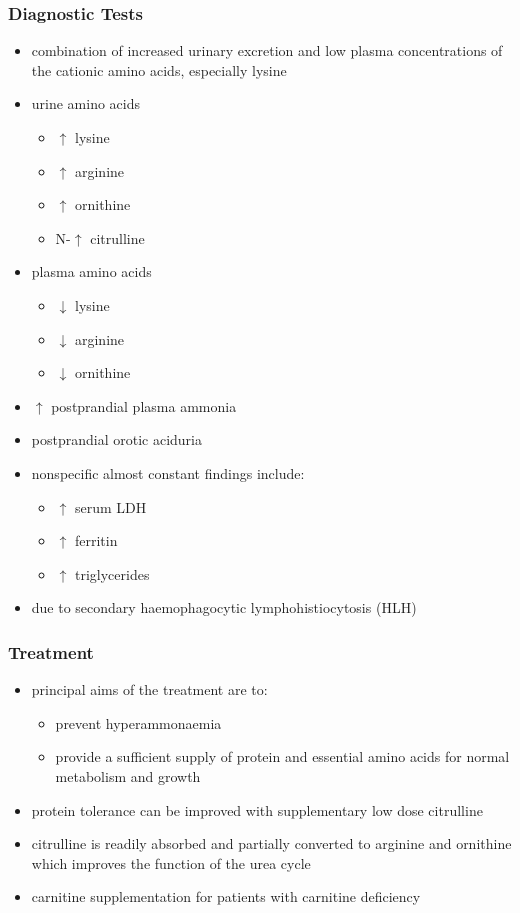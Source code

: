\documentclass{scrartcl}
\begin{document}
\subsubsection{Diagnostic Tests}
\label{sec:org27e0b70}
\begin{itemize}
\item combination of increased urinary excretion and low plasma
concentrations of the cationic amino acids, especially lysine
\item urine amino acids
\begin{itemize}
\item \(\uparrow\) lysine
\item \(\uparrow\) arginine
\item \(\uparrow\) ornithine
\item N-\(\uparrow\) citrulline
\end{itemize}
\item plasma amino acids
\begin{itemize}
\item \(\downarrow\) lysine
\item \(\downarrow\) arginine
\item \(\downarrow\) ornithine
\end{itemize}
\item \(\uparrow\) postprandial plasma ammonia
\item postprandial orotic aciduria
\item nonspecific almost constant findings include:
\begin{itemize}
\item \(\uparrow\) serum LDH
\item \(\uparrow\) ferritin
\item \(\uparrow\) triglycerides
\end{itemize}
\item due to secondary haemophagocytic lymphohistiocytosis (HLH)
\end{itemize}

\subsubsection{Treatment}
\label{sec:orgd43f3ec}
\begin{itemize}
\item principal aims of the treatment are to:
\begin{itemize}
\item prevent hyperammonaemia
\item provide a sufficient supply of protein and essential amino acids
for normal metabolism and growth
\end{itemize}

\item protein tolerance can be improved with supplementary low dose
citrulline
\item citrulline is readily absorbed and partially converted to arginine
and ornithine which improves the function of the urea cycle
\item carnitine supplementation for patients with carnitine deficiency
\end{itemize}
\end{document}
